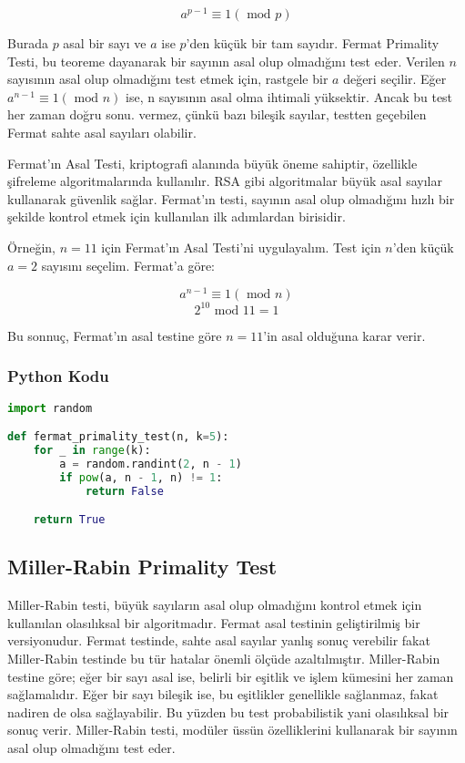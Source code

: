 \[ a^{p-1} \equiv 1 (\text{ mod } p) \]

Burada $p$ asal bir sayı ve $a$ ise $p$'den küçük bir tam sayıdır. Fermat Primality Testi, bu teoreme dayanarak bir sayının asal olup olmadığını test eder. Verilen $n$ sayısının asal olup olmadığını test etmek için, rastgele bir $a$ değeri seçilir. Eğer $a^{n-1} \equiv 1 (\text{ mod } n)$ ise, n sayısının asal olma ihtimali yüksektir. Ancak bu test her zaman doğru sonu. vermez, çünkü bazı bileşik sayılar, testten geçebilen Fermat sahte asal sayıları olabilir.

Fermat’ın Asal Testi, kriptografi alanında büyük öneme sahiptir, özellikle şifreleme algoritmalarında kullanılır. RSA gibi algoritmalar büyük asal sayılar kullanarak güvenlik sağlar. Fermat’ın testi, sayının asal olup olmadığını hızlı bir şekilde kontrol etmek için kullanılan ilk adımlardan birisidir.

Örneğin, $n = 11$ için Fermat'ın Asal Testi'ni uygulayalım. Test için $n$'den küçük $a = 2$ sayısını seçelim. Fermat'a göre:

\[ a^{n-1} \equiv 1 (\text{ mod } n) \]
\[ 2^10 \text{ mod } 11 = 1 \]

Bu sonnuç, Fermat'ın asal testine göre $n = 11$'in asal olduğuna karar verir.

\subsubsection{Python Kodu}

\begin{lstlisting}[language=Python]
import random

def fermat_primality_test(n, k=5):
    for _ in range(k):
        a = random.randint(2, n - 1)
        if pow(a, n - 1, n) != 1:
            return False

    return True
\end{lstlisting}

\newpage

\subsection{Miller-Rabin Primality Test}

Miller-Rabin testi, büyük sayıların asal olup olmadığını kontrol etmek için kullanılan olasılıksal bir algoritmadır. Fermat asal testinin geliştirilmiş bir versiyonudur. Fermat testinde, sahte asal sayılar yanlış sonuç verebilir fakat Miller-Rabin testinde bu tür hatalar önemli ölçüde azaltılmıştır. Miller-Rabin testine göre; eğer bir sayı asal ise, belirli bir eşitlik ve işlem kümesini her zaman sağlamalıdır. Eğer bir sayı bileşik ise, bu eşitlikler genellikle sağlanmaz, fakat nadiren de olsa sağlayabilir. Bu yüzden bu test probabilistik yani olasılıksal bir sonuç verir. Miller-Rabin testi, modüler üssün özelliklerini kullanarak bir sayının asal olup olmadığını test eder.

